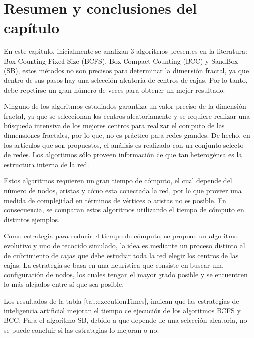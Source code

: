 \newpage
\section{Resumen y conclusiones del capítulo}

En este capitulo, inicialmente se analizan 3 algoritmos presentes en la literatura: Box Counting Fixed Size (BCFS), Box Compact Counting (BCC) y SandBox (SB), estos métodos no son precisos para determinar la dimensión fractal, ya que dentro de sus pasos hay una selección aleatoria de centros de cajas. Por lo tanto, debe repetirse un gran número de veces para obtener un mejor resultado.

Ninguno de los algoritmos estudiados garantiza un valor preciso de la dimensión fractal, ya que se seleccionan los centros aleatoriamente y se requiere realizar una búsqueda intensiva de los mejores centros para realizar el computo de las dimensiones fractales, por lo que, no es práctico para redes grandes. De hecho, en los artículos que son propuestos, el análisis es realizado con un conjunto selecto de redes. Los algoritmos sólo proveen información de que tan heterogénea es la estructura interna de la red.

Estos algoritmos requieren un gran tiempo de cómputo, el cual depende del número de nodos, aristas y cómo esta conectada la red, por lo que proveer una medida de complejidad en términos de vértices o aristas no es posible. En consecuencia, se comparan estos algoritmos utilizando el tiempo de cómputo en distintos ejemplos.

Como estrategia para reducir el tiempo de cómputo, se propone un algoritmo evolutivo y uno de recocido simulado, la idea es mediante un proceso distinto al de cubrimiento de cajas que debe estudiar toda la red elegir los centros de las cajas. La estrategia se basa en una heurística que consiste en buscar una configuración de nodos, los cuales tengan el mayor grado posible y se encuentren lo más alejados entre sí que sea posible.

Los resultados de la tabla \ref{tab:executionTimes}, indican que las estrategias de inteligencia artificial mejoran el tiempo de ejecución de los algoritmos BCFS y BCC: Para el algoritmo SB, debido a que depende de una selección aleatoria, no se puede concluir si las estrategias lo mejoran o no. 